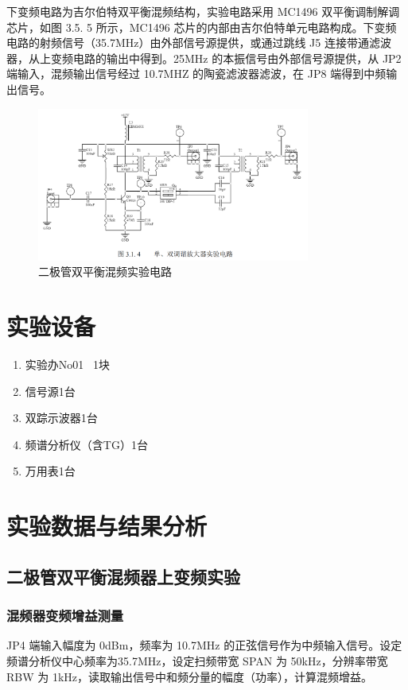 \documentclass{../source/Experiment}
\begin{document}
下变频电路为吉尔伯特双平衡混频结构，实验电路采用 MC1496 双平衡调制解调芯片，如图 3.5. 5 所示，MC1496 芯片的内部由吉尔伯特单元电路构成。下变频电路的射频信号（35.7MHz）由外部信号源提供，或通过跳线 J5 连接带通滤波器，从上变频电路的输出中得到。25MHz 的本振信号由外部信号源提供，从 JP2 端输入，混频输出信号经过 10.7MHZ 的陶瓷滤波器滤波，在 JP8 端得到中频输出信号。

\begin{figure}[H]
    \centering
    \includegraphics[width = 0.8\textwidth]{pic/fig2.png}
    \caption{二极管双平衡混频实验电路}
\end{figure}

\section{实验设备}
\begin{enumerate}
    \item 实验办No01 \, 1块
    \item 信号源1台
    \item 双踪示波器1台
    \item 频谱分析仪（含TG）1台
    \item 万用表1台
\end{enumerate}

\section{实验数据与结果分析}
\subsection{二极管双平衡混频器上变频实验}
\subsubsection{混频器变频增益测量}

JP4 端输入幅度为 0dBm，频率为 10.7MHz 的正弦信号作为中频输入信号。设定频谱分析仪中心频率为35.7MHz，设定扫频带宽 SPAN 为 50kHz，分辨率带宽 RBW 为 1kHz，读取输出信号中和频分量的幅度（功率），计算混频增益。
\end{document}
